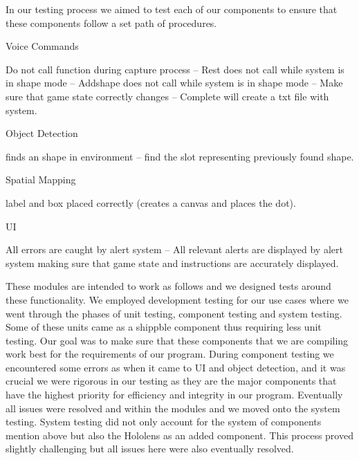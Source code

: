 \documentclass[12pt]{article}
\begin{document}
In our testing process we aimed to test each of our components to ensure that these components follow a set path of procedures. 

\hspace{1cm}
\item Voice Commands
    \begin{description}
        \hspace{1cm}
     Do not call function during capture process -- Rest does not call while system is in shape mode -- Addshape does not call while system is in shape mode -- Make sure that game state correctly changes -- Complete will create a txt file with system.
    \end{description}
    
    \item Object Detection 
    \begin{description}
        \hspace{1cm}
        finds an shape in environment -- find the slot representing previously found shape.
    \end{description}
    
    \item Spatial Mapping
    \begin{description}
        \hspace{1cm}
        label and box placed correctly (creates a canvas and places the dot). 
    \end{description}
    
     \item UI
    \begin{description}
      All errors are caught by alert system -- All relevant alerts are displayed by alert system making sure that game state and instructions are accurately displayed.
    \end{description}

    \hspace{1cm}

    These modules are intended to work as follows and we designed tests around these functionality. We employed development testing for our use cases where we went through the phases of unit testing, component testing and system testing. Some of these units came as a shippble component thus requiring less unit testing. Our goal was to make sure that these components that we are compiling work best for the requirements of our program. During component testing we encountered some errors as when it came to UI and object detection, and it was crucial we were rigorous in our testing as they are the major components that have the highest priority for efficiency and integrity in our program. Eventually all issues were resolved and within the modules and we moved onto the system testing. System testing did not only account for the system of components mention above but also the Hololens as an added component. This process proved slightly challenging but all issues here were also eventually resolved. 
\end{document}
